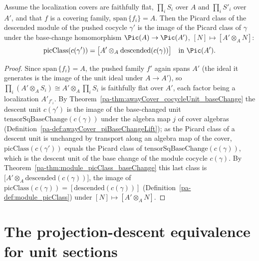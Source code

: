 \begin{theorem}
  \label{pa-thm:awayCover_pic_baseChange}
  \leanok

  Assume the localization covers are faithfully flat, \(\prod_i S_i\) over \(A\) and \(\prod_i
  S'_i\) over \(A'\), and that \(f\) is a covering family, \(\mathrm{span}\,\{f_i\} = A\).  Then
  the Picard class of the descended module of the pushed cocycle \(\gamma'\) is the image of the
  Picard class of \(\gamma\) under the base-change homomorphism \(\Pic(A) \to \Pic(A')\),
  \([N] \mapsto [A' \otimes_A N]\):
  \[
    \mathrm{picClass}(c(\gamma')) = \bigl[A' \otimes_A \mathrm{descended}(c(\gamma))\bigr]
    \quad\text{in }\Pic(A').
  \]
\end{theorem}
\begin{proof}
  \leanok
  Since \(\mathrm{span}\,\{f_i\} = A\), the pushed family \(f'\) again spans \(A'\) (the ideal it
  generates is the image of the unit ideal under \(A \to A'\)), so \(\prod_i (A' \otimes_A S_i)
  \cong A' \otimes_A \prod_i S_i\) is faithfully flat over \(A'\), each factor being a
  localization \(A'_{f'_i}\).  By Theorem~\ref{pa-thm:awayCover_cocycleUnit_baseChange} the descent
  unit \(c(\gamma')\) is the image of the base-changed unit
  \(\mathrm{tensorSqBaseChange}(c(\gamma))\) under the algebra map \(j\) of cover algebras
  (Definition~\ref{pa-def:awayCover_piBaseChangeLift}); as the Picard class of a descent unit is
  unchanged by transport along an algebra map of the cover, \(\mathrm{picClass}(c(\gamma'))\)
  equals the Picard class of \(\mathrm{tensorSqBaseChange}(c(\gamma))\), which is the descent
  unit of the base change of the module cocycle \(c(\gamma)\).  By
  Theorem~\ref{pa-thm:module_picClass_baseChange} this last class is \(\bigl[A' \otimes_A
  \mathrm{descended}(c(\gamma))\bigr]\), the image of
  \(\mathrm{picClass}(c(\gamma)) = [\mathrm{descended}(c(\gamma))]\)
  (Definition~\ref{pa-def:module_picClass}) under \([N] \mapsto [A' \otimes_A N]\).
\end{proof}

\section{The projection-descent equivalence for unit sections}
\label{pa-sec:projectionUnits}

